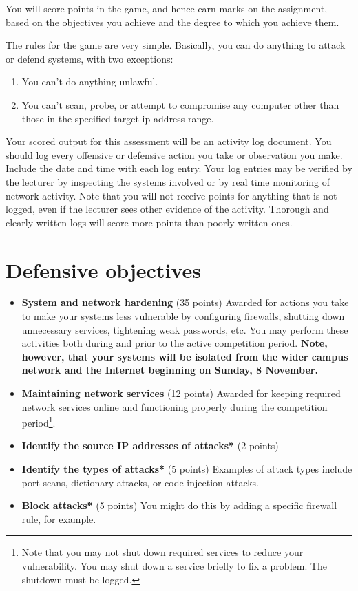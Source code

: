 \documentclass{article}   	%
\begin{document}
You will score points in the game, and hence earn marks on the assignment, based on the objectives you achieve and the degree to which you achieve them.

The rules for the game are very simple.  Basically, you can do anything to attack or defend systems, with two exceptions:

\begin{enumerate}
  \item You can't do anything unlawful.
  \item You can't scan, probe, or attempt to compromise any computer other than those in the specified target ip address range.
	  \end{enumerate}

Your scored output for this assessment will be an activity log document. You should log every offensive or defensive action you take or observation you make.  Include the date and  time with each log entry.  Your log entries may be verified by the lecturer by inspecting the systems involved or by real time monitoring of network activity. Note that you will not receive points for anything that is not logged, even if the lecturer sees other evidence of the activity.  Thorough and clearly written logs will score more points than poorly written ones.


\section*{Defensive objectives}
\begin{itemize}
	\item \textbf{System and network hardening} (35 points)  Awarded for actions you take to make your systems less vulnerable by configuring firewalls, shutting down unnecessary services, tightening weak passwords, etc.  You may perform these activities both during and prior to the active competition period. \textbf{Note, however, that your systems will be isolated from the wider campus network and the Internet beginning on Sunday, 8 November.}
  \item \textbf{Maintaining network services} (12 points)  Awarded for keeping required network services online and functioning properly during the competition period\footnote{Note that you may not shut down required services to reduce your vulnerability. You may shut down a service briefly to fix a problem. The shutdown must be logged.}.
  \item \textbf{Identify the source IP addresses of attacks*} (2 points)
  \item \textbf{Identify the types of attacks*} (5 points) Examples of attack types include port scans, dictionary attacks, or code injection attacks.
  \item \textbf{Block attacks*} (5 points) You might do this by adding a specific firewall rule, for example.
  
\end{itemize}
\end{document}
